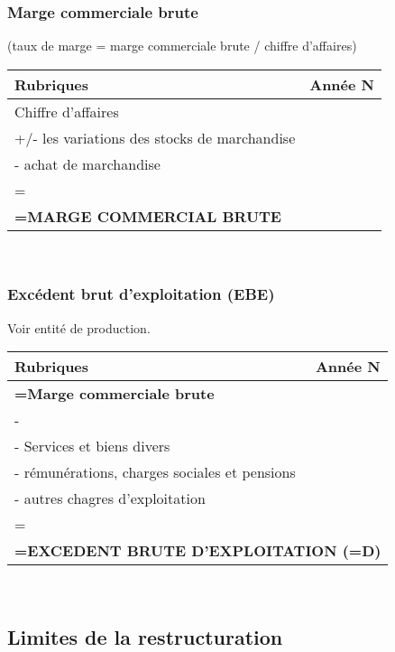 \documentclass{article}
\begin{document}
\subsubsection*{Marge commerciale brute}
(taux de marge = marge commerciale brute /
chiffre d’affaires) 
\begin{center}
\begin{tabular}{|l|c|}
    \hline
    \textbf{Rubriques} & \textbf{Année N}\\
    \hline
    Chiffre d'affaires & \\
    +/- les variations des stocks de marchandise &\\
    - achat de marchandise & \\
    \hline
    \multicolumn{2}{l}{ = }\\
    \hline
    \multicolumn{2}{|l|}{\textbf{=MARGE COMMERCIAL BRUTE}}   \\
    \hline
\end{tabular}
\end{center}
\\ 

\subsubsection*{Excédent brut d'exploitation (EBE)}
Voir entité de production.

\begin{center}
\begin{tabular}{|l|c|}
    \hline
    \textbf{Rubriques} & \textbf{Année N}\\
    \hline
    \multicolumn{2}{|l|}{\textbf{=Marge commerciale brute}}   \\
    \hline
    \multicolumn{2}{l}{ - }\\
    \hline
    - Services et biens divers &\\
    - rémunérations, charges sociales et pensions & \\
    - autres chagres d'exploitation & \\
    \hline
    \multicolumn{2}{l}{ = }\\
    \hline
    \multicolumn{2}{|l|}{\textbf{=EXCEDENT BRUTE D'EXPLOITATION (=D)}}   \\
    \hline
\end{tabular}
\end{center}
\\ 

\subsection{Limites de la restructuration}
\end{document}
